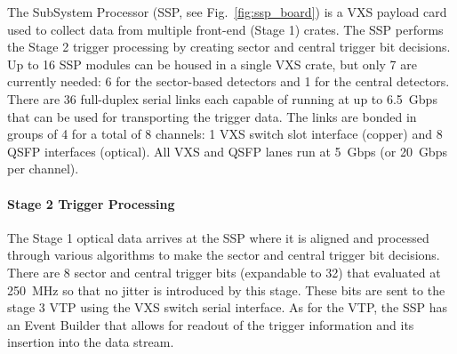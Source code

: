 The SubSystem Processor (SSP, see Fig.~\ref{fig:ssp_board}) is a VXS payload card used to collect data from multiple front-end (Stage 1) crates. The SSP performs the Stage 2 trigger processing by creating sector and central trigger bit decisions. Up to 16 SSP modules can be housed in a single VXS crate, but only 7 are currently needed: 6 for the sector-based detectors and 1 for the central detectors. There are 36 full-duplex serial links each capable of running at up to 6.5~Gbps that can be used for transporting the trigger data. The links are bonded in groups of 4 for a total of 8 channels: 1 VXS switch slot interface (copper) and 8 QSFP interfaces (optical). All VXS and QSFP lanes run at 5~Gbps (or 20~Gbps per channel).

\paragraph{Stage 2 Trigger Processing}
The Stage 1 optical data arrives at the SSP where it is aligned and processed through various algorithms to make the sector and central trigger bit decisions. There are 8 sector and central trigger bits (expandable to 32) that evaluated at 250~MHz so that no jitter is introduced by this stage. These bits are sent to the stage 3 VTP using the VXS switch serial interface. As for the VTP, the SSP has an Event Builder that allows for readout of the trigger information and its insertion into the data stream.
